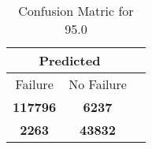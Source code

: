 \begin{table}[] 
\label{Table: Prediction Accuracy-DMD95.0OnlySunEKF-resetReflection-Reflection} 
\caption{Confusion Matric for 95.0} 
\centering 
\begin{tabular} 
 {@{}ccc@{}} 
\toprule 
\multicolumn{2}{c}{\textbf{Predicted}}
 \\ \midrule 
\multicolumn{1}{|c|}{Failure} & 
\multicolumn{1}{c|}{No Failure}
 \\ \midrule 
\multicolumn{1}{|c|}{\color{green}\textbf{117796}} & 
\multicolumn{1}{c|}{\color{red}\textbf{6237}}
 \\ \midrule 
\multicolumn{1}{|c|}{\color{red}\textbf{2263}} & 
\multicolumn{1}{c|}{\color{green}\textbf{43832}}
 \\ \bottomrule 
\end{tabular} 
\end{table} 

